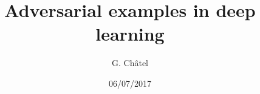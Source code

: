 \documentclass[9pt]{beamer}
\title{Adversarial examples in deep learning}
\author{G. Châtel}
\date{06/07/2017}
\begin{document}
\begin{frame}

  \maketitle

\end{frame}
\end{document}
